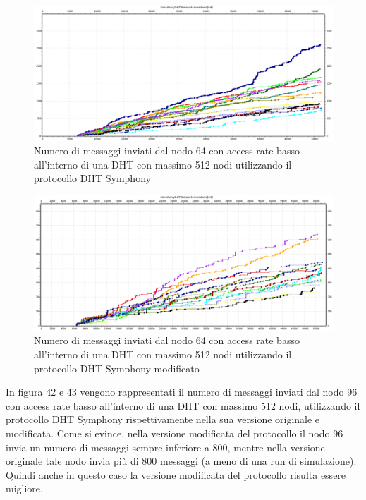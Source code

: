 \documentclass[	
	DIV=calc,
	paper=a4,
	fontsize=11pt,
	onecolumn
]{scrartcl} %
\begin{document}
	\begin{figure}[H]
		\centering
		\includegraphics[scale=0.35]	{SymphonyDHT/plots/MessagesSentByEveryNode/512_Nodes_SlowAccess/SymphonyDHT_512Nodes_SlowAccess_Node64.png}
		\caption{Numero di messaggi inviati dal nodo 64 con access rate basso all'interno di una DHT con massimo 512 nodi utilizzando il protocollo DHT Symphony}
		\label{Figura 40}
	\end{figure}
	\begin{figure}[H]
		\centering
		\includegraphics[scale=0.35]	{SymphonyDHTMod/plots/MessagesSentByEveryNode/512_Nodes_SlowAccess/SymphonyDHTMod_512Nodes_SlowAccess_Node64.png}
		\caption{Numero di messaggi inviati dal nodo 64 con access rate basso all'interno di una DHT con massimo 512 nodi utilizzando il protocollo DHT Symphony modificato}
		\label{Figura 41}
	\end{figure}	
	
	In figura 42 e 43 vengono rappresentati il numero di messaggi inviati dal nodo 96 con access rate basso all'interno di una DHT con massimo 512 nodi, utilizzando il protocollo DHT Symphony rispettivamente nella sua versione originale e modificata. Come si evince, nella versione modificata del protocollo il nodo 96 invia un numero di messaggi sempre inferiore a 800, mentre nella versione originale tale nodo invia più di 800 messaggi (a meno di una run di simulazione). Quindi anche in questo caso la versione modificata del protocollo risulta essere migliore.
	
\end{document}
